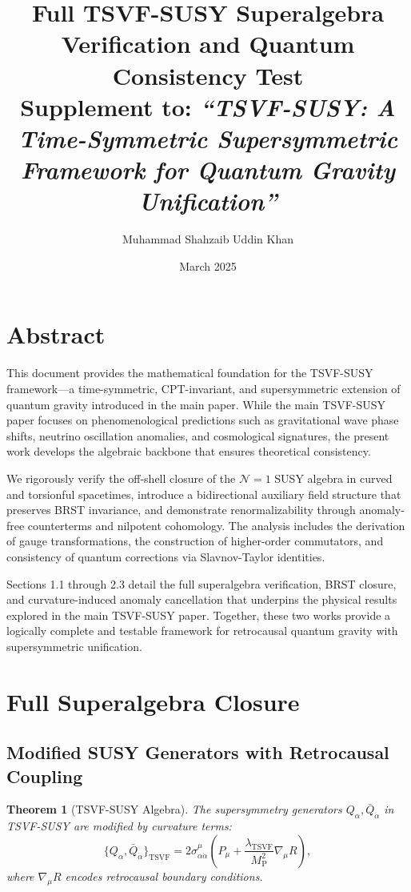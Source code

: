 \documentclass[12pt, onecolumn]{article}
\title{\textbf{Full TSVF-SUSY Superalgebra Verification and Quantum Consistency Test} \\[0.5em]
\large Supplement to: \emph{“TSVF-SUSY: A Time-Symmetric Supersymmetric Framework for Quantum Gravity Unification”}}
\author{Muhammad Shahzaib Uddin Khan}
\date{March 2025}
\newtheorem{theorem}{Theorem}[section]
\theoremstyle{definition}
\newcommand{\tsvf}{\lambda_{\mathrm{TSVF}}}
\newcommand{\Mp}{M_{\mathrm{P}}}
\numberwithin{equation}{section}
\begin{document}
\maketitle

\vspace{1.5em}

\section*{Abstract}

This document provides the mathematical foundation for the TSVF-SUSY framework—a time-symmetric, CPT-invariant, and supersymmetric extension of quantum gravity introduced in the main paper. While the main TSVF-SUSY paper focuses on phenomenological predictions such as gravitational wave phase shifts, neutrino oscillation anomalies, and cosmological signatures, the present work develops the algebraic backbone that ensures theoretical consistency.

We rigorously verify the off-shell closure of the \( \mathcal{N}=1 \) SUSY algebra in curved and torsionful spacetimes, introduce a bidirectional auxiliary field structure that preserves BRST invariance, and demonstrate renormalizability through anomaly-free counterterms and nilpotent cohomology. The analysis includes the derivation of gauge transformations, the construction of higher-order commutators, and consistency of quantum corrections via Slavnov-Taylor identities.

Sections 1.1 through 2.3 detail the full superalgebra verification, BRST closure, and curvature-induced anomaly cancellation that underpins the physical results explored in the main TSVF-SUSY paper. Together, these two works provide a logically complete and testable framework for retrocausal quantum gravity with supersymmetric unification.

\newpage

\section{Full Superalgebra Closure} 
\label{sec:SUSY_closure}
\subsection{Modified SUSY Generators with Retrocausal Coupling} 
\label{subsec:modified_generators}

\begin{theorem}[TSVF-SUSY Algebra]
\label{thm:SUSY_algebra}
The supersymmetry generators \(Q_\alpha, \bar{Q}_{\dot{\alpha}}\) in TSVF-SUSY are modified by curvature terms:
\begin{equation}
\{ Q_\alpha, \bar{Q}_{\dot{\alpha}} \}_{\text{TSVF}} = 2 \sigma^\mu_{\alpha\dot{\alpha}} \left( P_\mu + \frac{\tsvf}{\Mp^2} \nabla_\mu R \right),
\label{eq:SUSY_modified}
\end{equation}
where \(\nabla_\mu R\) encodes retrocausal boundary conditions.
\end{theorem}
\end{document}
